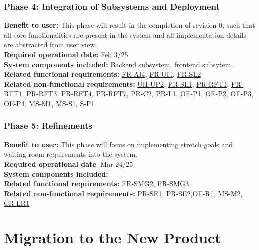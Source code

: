 \documentclass[12pt]{article}
\begin{document}
\subsubsection*{Phase 4: Integration of Subsystems and Deployment}
\textbf{Benefit to user:} This phase will result in the completion of revision 0, such that all core functionalities are present in the system and all implementation details are abstracted from user view. \\
\textbf{Required operational date:} Feb 3/25 \\
\textbf{System components included:} Backend subsystem, frontend subsytem.\\
\textbf{Related functional requirements:} \hyperref[FR-AI4]{FR-AI4}, \hyperref[FR-UI1]{FR-UI1}, \hyperref[FR-SL2]{FR-SL2}\\
\textbf{Related non-functional requirements:} \hyperref[UH-UP2]{UH-UP2}, \hyperref[PR-SL1]{PR-SL1}, \hyperref[PR-RFT1]{PR-RFT1}, \hyperref[PR-RFT2]{PR-RFT1}, 
\hyperref[PR-RFT3]{PR-RFT3}, \hyperref[PR-RFT4]{PR-RFT4}, \hyperref[PR-RFT7]{PR-RFT7}, \hyperref[PR-C2]{PR-C2}, \hyperref[PR-L1]{PR-L1}, \hyperref[OE-P1]{OE-P1}, 
\hyperref[OE-P2]{OE-P2}, \hyperref[OE-P3]{OE-P3}, \hyperref[OE-P4]{OE-P4}, \hyperref[MS-M1]{MS-M1}, \hyperref[MS-S1]{MS-S1}, \hyperref[S-P1]{S-P1} \\

\subsubsection*{Phase 5: Refinements}
\textbf{Benefit to user:} This phase will focus on implementing stretch goals and waiting room requirements into the system. \\
\textbf{Required operational date}: Mar 24/25 \\
\textbf{System components included:} \\
\textbf{Related functional requirements:} \hyperref[FR-SMG2]{FR-SMG2}, \hyperref[FR-SMG3]{FR-SMG3}\\
\textbf{Related non-functional requirements:} \hyperref[PR-SE1]{PR-SE1}, \hyperref[PR-SE2]{PR-SE2},\hyperref[OE-R1]{OE-R1}, \hyperref[MS-M2]{MS-M2}, \hyperref[CR-LR1]{CR-LR1} \\


\section{Migration to the New Product}
\end{document}
